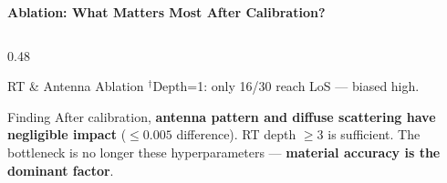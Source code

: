 \documentclass[
    aspectratio=169
]{beamer}
\begin{document}
\begin{frame}{\textbf{Ablation: What Matters Most After Calibration?}}
\begin{columns}[T]
\begin{column}{0.48\textwidth}
\begin{block}{\footnotesize RT \& Antenna Ablation}
\footnotesize
\vspace{0.1cm}
$^\dagger$Depth=1: only 16/30 reach LoS --- biased high.
\vspace{0.2cm}
\begin{block}{\scriptsize Finding}
\scriptsize
After calibration, \textbf{antenna pattern and diffuse scattering have negligible impact} ($\leq 0.005$ difference). RT depth $\geq$3 is sufficient. The bottleneck is no longer these hyperparameters --- \textbf{material accuracy is the dominant factor}.
\end{block}
\end{block}
\end{column}
\end{columns}
\end{frame}

\end{document}
